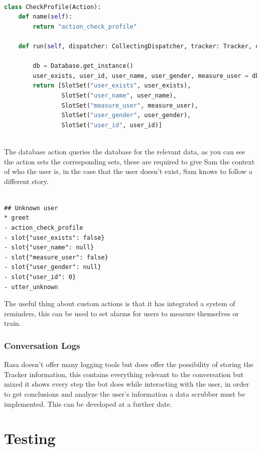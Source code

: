 \begin{lstlisting}[language=Python]

class CheckProfile(Action):
	def name(self):
		return "action_check_profile"

	def run(self, dispatcher: CollectingDispatcher, tracker: Tracker, domain: Dict[Text, Any]) -> List[Dict[Text, Any]]:

		db = Database.get_instance()
		user_exists, user_id, user_name, user_gender, measure_user = db.check_user_exists(tracker.sender_id)
		return [SlotSet("user_exists", user_exists),
			    SlotSet("user_name", user_name),
				SlotSet("measure_user", measure_user),
				SlotSet("user_gender", user_gender),
				SlotSet("user_id", user_id)]
				
\end{lstlisting}

The database action queries the database for the relevant data, as you can see the action sets the corresponding sets, these are required to give Sam the context of who the user is, in the case that the user doesn’t exist, Sam knows to follow a different story.

\begin{lstlisting}

## Unknown user
* greet
- action_check_profile
- slot{"user_exists": false}
- slot{"user_name": null}
- slot{"measure_user": false}
- slot{"user_gender": null}
- slot{"user_id": 0}
- utter_unknown

\end{lstlisting}

The useful thing about custom actions is that it has integrated a system of reminders, this can be used to set alarms for users to measure themselves or train.

\subsubsection{Conversation Logs}\label{sec:chap4_conv_logs}

Rasa doesn’t offer many logging tools but does offer the possibility of storing the Tracker information, this contains everything relevant to the conversation but mixed it shows every step the bot does while interacting with the user, in order to get conclusions and analyze the user’s information a data scrubber must be implemented. This can be developed at a further date.

\section{Testing}\label{sec:chap4_test}

